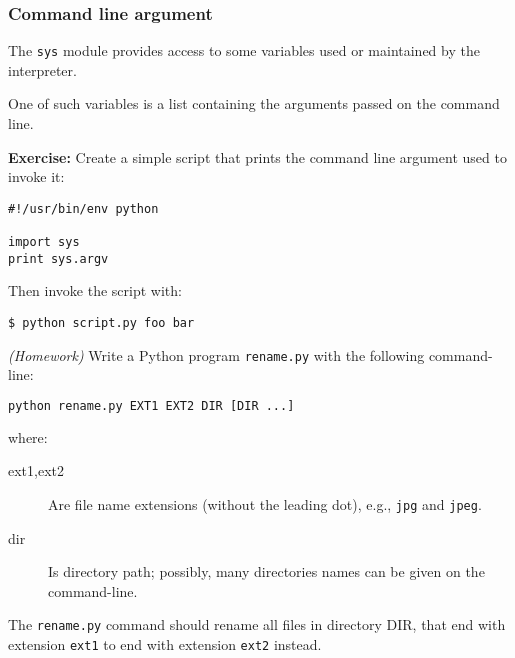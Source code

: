 \documentclass[english,serif,mathserif,xcolor=pdftex,dvipsnames,table]{beamer}
\begin{document}
\begin{frame}[fragile]
  \frametitle{Command line argument}
  The \texttt{sys} module provides access to some variables used or
  maintained by the interpreter.

  One of such variables is a list containing the arguments passed on
  the command line.

  \textbf{Exercise:} Create a simple script that
  prints the command line argument used to invoke it:

  \begin{lstlisting}
#!/usr/bin/env python

import sys
print sys.argv
  \end{lstlisting}

\+
Then invoke the script with:

\begin{lstlisting}
$ python script.py foo bar
\end{lstlisting}
\end{frame}



\begin{frame}[fragile]
  \begin{exercise}\emph{(Homework)}
    Write a Python program \texttt{rename.py} with the following
    command-line:
\begin{lstlisting}[language=sh]
python rename.py EXT1 EXT2 DIR [DIR ...]
\end{lstlisting}
    where:
    \begin{description}
    \item[ext1,ext2] Are file name extensions (without the leading
      dot), e.g., \texttt{jpg} and \texttt{jpeg}.
    \item[dir] Is directory path; possibly, many directories names can
      be given on the command-line.
    \end{description}

    The \texttt{rename.py} command should rename all files in
    directory DIR, that end with extension \texttt{ext1} to end with
    extension \texttt{ext2} instead.
  \end{exercise}
\end{frame}
\end{document}
